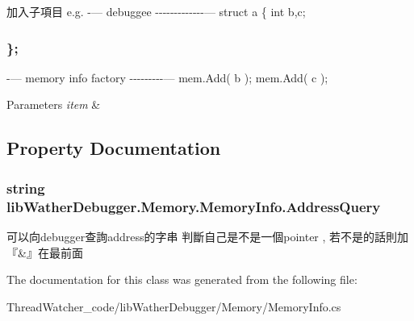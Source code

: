 加入子項目 e.\+g. -\/--- debuggee -\/-\/-\/-\/-\/-\/-\/-\/-\/-\/-\/-\/-\/--- struct a \{ int b,c; \subsubsection*{\}; }

-\/--- memory info factory -\/-\/-\/-\/-\/-\/-\/-\/-\/--- mem.\+Add( b ); mem.\+Add( c ); 


\begin{DoxyParams}{Parameters}
{\em item} & \\
\hline
\end{DoxyParams}


\subsection{Property Documentation}
\hypertarget{classlib_wather_debugger_1_1_memory_1_1_memory_info_a9b27a0acfa775714307ce1e9c6df0e0f}{
\subsubsection[{Address\+Query}]{\setlength{\rightskip}{0pt plus 5cm}string lib\+Wather\+Debugger.\+Memory.\+Memory\+Info.\+Address\+Query\hspace{0.3cm}{\ttfamily [get]}}}\label{classlib_wather_debugger_1_1_memory_1_1_memory_info_a9b27a0acfa775714307ce1e9c6df0e0f}


可以向debugger查詢address的字串 判斷自己是不是一個pointer , 若不是的話則加『\&』在最前面 



The documentation for this class was generated from the following file\+:\begin{DoxyCompactItemize}
\item 
Thread\+Watcher\+\_\+code/lib\+Wather\+Debugger/\+Memory/Memory\+Info.\+cs\end{DoxyCompactItemize}
